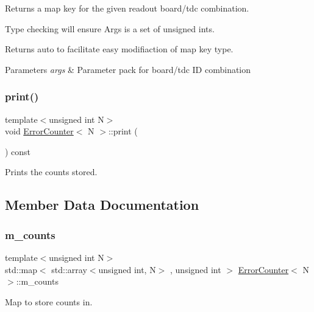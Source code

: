 Returns a map key for the given readout board/tdc combination. 

Type checking will ensure Args is a set of unsigned ints.

Returns auto to facilitate easy modifiaction of map key type. 
\begin{DoxyParams}{Parameters}
{\em args} & Parameter pack for board/tdc ID combination \\
\hline
\end{DoxyParams}
\mbox{\label{class_error_counter_abdfe6078e6536b0af4860e84d0cb113c}} 
\subsubsection{\texorpdfstring{print()}{print()}}
{\footnotesize\ttfamily template$<$unsigned int N$>$ \\
void \hyperlink{class_error_counter}{Error\+Counter}$<$ N $>$\+::print (\begin{DoxyParamCaption}{ }\end{DoxyParamCaption}) const}



Prints the counts stored. 



\subsection{Member Data Documentation}
\mbox{\label{class_error_counter_ac5903c289a98aa3fd0ac8294a83fa711}} 
\subsubsection{\texorpdfstring{m\+\_\+counts}{m\_counts}}
{\footnotesize\ttfamily template$<$unsigned int N$>$ \\
std\+::map$<$ std\+::array$<$unsigned int, N$>$ , unsigned int $>$ \hyperlink{class_error_counter}{Error\+Counter}$<$ N $>$\+::m\+\_\+counts\hspace{0.3cm}{\ttfamily [private]}}



Map to store counts in. 

